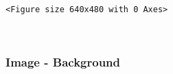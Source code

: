 \documentclass[11pt]{article}
\begin{document}
    
    \begin{Verbatim}[commandchars=\\\{\}]
<Figure size 640x480 with 0 Axes>
    \end{Verbatim}

    
    \begin{center}
    \end{center}
    { \hspace*{\fill} \\}
    
    \subsubsection{Image - Background}\label{image---background}
\end{document}
